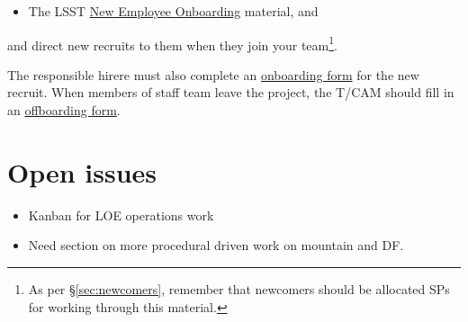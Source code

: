 \begin{itemize}
\item The \gls{LSST} \href{https://project.lsst.org/onboarding}{New Employee
  Onboarding} material, and
\end{itemize}

and direct new recruits to them when they join your team\footnote{As per \S\ref{sec:newcomers}, remember that newcomers should be allocated \glspl{SP} for working through this material.}.

The responsible hirere must also complete an \href{https://project.lsst.org/onboarding/form}{onboarding form} for the new recruit.
When members of staff team leave the project, the \gls{T/CAM} should fill in an \href{https://project.lsst.org/onboarding/offboarding_form}{offboarding form}.


\section{Open issues}

\begin{itemize}
\item Kanban for \gls{LOE} operations work
\item Need section on more procedural driven work on mountain and \gls{DF}.
\end{itemize}


